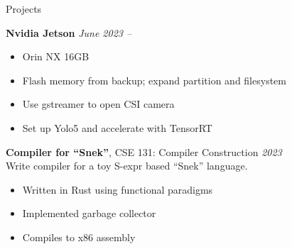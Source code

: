 	\begin{rSection}{Projects}


		{\bf Nvidia Jetson}{} \hfill {\em June 2023 -- }
		\begin{multicols}{2}
			\begin{itemize}
				\item Orin NX 16GB
				\item Flash memory from backup; expand partition and filesystem
				\item Use gstreamer to open CSI camera
				\item Set up Yolo5 and accelerate with TensorRT
			\end{itemize}
		\end{multicols}

		{\bf Compiler for ``Snek''}{, CSE 131: Compiler Construction} \hfill {\em 2023} \\
		Write compiler for a toy S-expr based ``Snek'' language.
		\begin{multicols}{2}
			\begin{itemize}
				\item Written in Rust using functional paradigms
				\item Implemented garbage collector
				\item Compiles to x86 assembly
			\end{itemize}
		\end{multicols}


\end{rSection}
